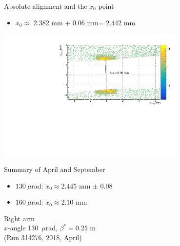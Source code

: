 \documentclass{beamer}
\begin{document}
\begin{frame}\scriptsize
	\begin{block}{Absolute alignment and the $x_{0}$ point}
    		\begin{itemize}
			\item $x_{0}\approx$ 2.382 mm + 0.06 mm= 2.442 mm
		\end{itemize}
             \includegraphics[width=0.7\textwidth]{Run_323311_130_murad_beta_star_0p27_m/elastic_for_meeting.pdf}\\
	\end{block}

	\begin{block}{Summary of April and September}
    		\begin{itemize}
			\item $130~\mu$rad: $x_{0}\approx 2.445$ mm $\pm$ 0.08
			\item $160~\mu$rad: $x_{0}\approx 2.10$ mm
		\end{itemize}
	\end{block}
	
\end{frame}


\begin{frame}
	\begin{center}
	\Large {\color{blue} Right arm}\\
	$x$-angle 130~$\mu$rad, $\beta^{*}=0.25$ m\\ {\small (Run 314276, 2018, April)}
	\end{center}
\end{frame}
\end{document}
